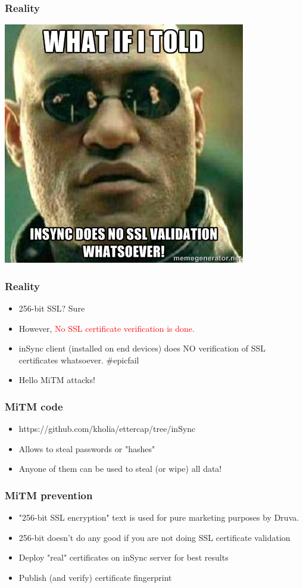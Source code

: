\documentclass{beamer}
\begin{document}
\begin{frame}
	\frametitle{Reality}
	\begin{center}
		\includegraphics[scale=0.7]{meme-1}
	\end{center}
\end{frame}


\begin{frame}
	\frametitle{Reality}
	\begin{itemize}
		\item 256-bit SSL? Sure
		\item However, \textcolor{red}{No SSL certificate verification is done.}
		\item inSync client (installed on end devices) does NO verification of SSL certificates whatsoever. \#epicfail
		\item Hello MiTM attacks!
	\end{itemize}
\end{frame}

\begin{frame}
	\frametitle{MiTM code}
	\begin{itemize}
		\item https://github.com/kholia/ettercap/tree/inSync
		\item Allows to steal passwords or "hashes"
		\item Anyone of them can be used to steal (or wipe) all data!
	\end{itemize}
\end{frame}

\begin{frame}
	\frametitle{MiTM prevention}
	\begin{itemize}
		\item "256-bit SSL encryption" text is used for
		pure marketing purposes by Druva.
		\item 256-bit doesn’t do any good if you are not doing
		SSL certificate validation
		\item Deploy "real" certificates on inSync server for best
		results
		\item Publish (and verify) certificate fingerprint
	\end{itemize}
\end{frame}
\end{document}
